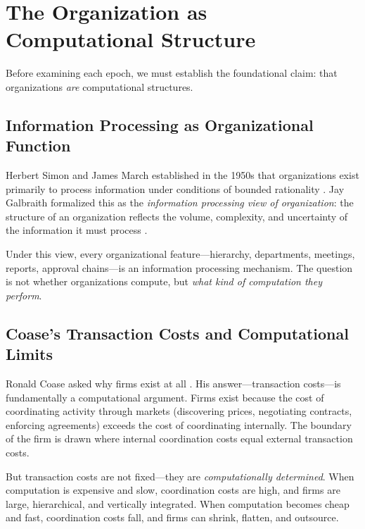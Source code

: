\documentclass[11pt,a4paper,twocolumn]{article}
\begin{document}
\section{The Organization as Computational Structure}
\label{sec:org-as-computation}

Before examining each epoch, we must establish the foundational claim: that organizations \textit{are} computational structures.

\subsection{Information Processing as Organizational Function}

Herbert Simon and James March established in the 1950s that organizations exist primarily to process information under conditions of bounded rationality \cite{simon1947}. Jay Galbraith formalized this as the \textit{information processing view of organization}: the structure of an organization reflects the volume, complexity, and uncertainty of the information it must process \cite{galbraith1974}.

Under this view, every organizational feature---hierarchy, departments, meetings, reports, approval chains---is an information processing mechanism. The question is not whether organizations compute, but \textit{what kind of computation they perform}.

\subsection{Coase's Transaction Costs and Computational Limits}

Ronald Coase asked why firms exist at all \cite{coase1937}. His answer---transaction costs---is fundamentally a computational argument. Firms exist because the cost of coordinating activity through markets (discovering prices, negotiating contracts, enforcing agreements) exceeds the cost of coordinating internally. The boundary of the firm is drawn where internal coordination costs equal external transaction costs.

But transaction costs are not fixed---they are \textit{computationally determined}. When computation is expensive and slow, coordination costs are high, and firms are large, hierarchical, and vertically integrated. When computation becomes cheap and fast, coordination costs fall, and firms can shrink, flatten, and outsource.
\end{document}
